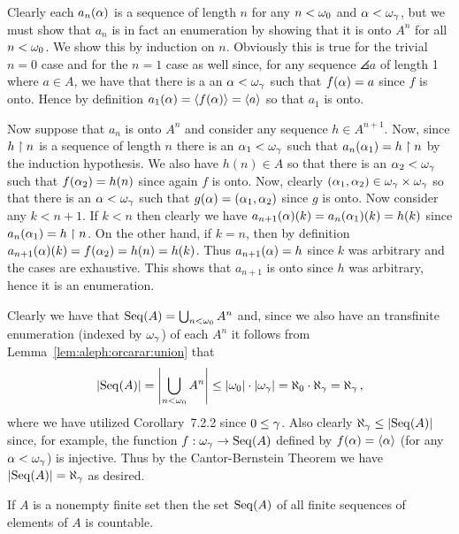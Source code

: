 {{    Clearly each $a_n(\alpha)$ is a sequence of length $n$ for any $n < \omega_0$ and $\alpha < \omega_\gamma$, but we must show that $a_n$ is in fact an enumeration by showing that it is onto $A^n$ for all $n < \omega_0$.
    We show this by induction on $n$.
    Obviously this is true for the trivial $n=0$ case and for the $n=1$ case as well since, for any sequence $\angles{a}$ of length 1 where $a \in A$, we have that there is a an $\alpha < \omega_\gamma$ such that $f(\alpha) = a$ since $f$ is onto.
    Hence by definition $a_1(\alpha) = \left\langle f(\alpha) \right\rangle = \left\langle a \right\rangle$ so that $a_1$ is onto.

    Now suppose that $a_n$ is onto $A^n$ and consider any sequence $h \in A^{n+1}$.
    Now, since $h \restriction n$ is a sequence of length $n$ there is an $\alpha_1 < \omega_\gamma$ such that $a_n(\alpha_1) = h \restriction n$ by the induction hypothesis.
    We also have $h(n) \in A$ so that there is an $\alpha_2 < \omega_\gamma$ such that $f(\alpha_2) = h(n)$ since again $f$ is onto.
    Now, clearly $(\alpha_1, \alpha_2) \in \omega_\gamma \times \omega_\gamma$ so that there is an $\alpha < \omega_\gamma$ such that $g(\alpha) = (\alpha_1, \alpha_2)$ since $g$ is onto.
    Now consider any $k < n+1$.
    If $k < n$ then clearly we have $a_{n+1}(\alpha)(k) = a_n(\alpha_1)(k) = h(k)$ since $a_n(\alpha_1) = h \restriction n$.
    On the other hand, if $k = n$, then by definition $a_{n+1}(\alpha)(k) = f(\alpha_2) = h(n) = h(k)$.
    Thus $a_{n+1}(\alpha) = h$ since $k$ was arbitrary and the cases are exhaustive.
    This shows that $a_{n+1}$ is onto since $h$ was arbitrary, hence it is an enumeration.

    Clearly we have that $\mathrm{Seq}(A) = \bigcup_{n < \omega_0} A^n$ and, since we also have an transfinite enumeration (indexed by $\omega_\gamma$) of each $A^n$ it follows from Lemma~\ref{lem:aleph:orcarar:union} that
    $$
    \left| \mathrm{Seq}(A) \right| = \left| \bigcup_{n < \omega_0} A^n \right| \leq \left| \omega_0 \right| \cdot \left| \omega_\gamma \right| = \aleph_0 \cdot \aleph_\gamma = \aleph_\gamma \,,
    $$
    where we have utilized Corollary~7.2.2 since $0 \leq \gamma$.
    Also clearly $\aleph_\gamma \leq \left| \mathrm{Seq}(A) \right|$ since, for example, the function $f: \omega_\gamma \to \mathrm{Seq}(A)$ defined by $f(\alpha) = \left\langle \alpha \right\rangle$ (for any $\alpha < \omega_\gamma$) is injective.
    Thus by the Cantor-Bernstein Theorem we have $\left| \mathrm{Seq}(A) \right| = \aleph_\gamma$ as desired.
  }

  \begin{cor}\label{cor:aleph:orcarar:seqfin}
    If $A$ is a nonempty finite set then the set $\mathrm{Seq}(A)$ of all finite sequences of elements of $A$ is countable.
  \end{cor}
  }
